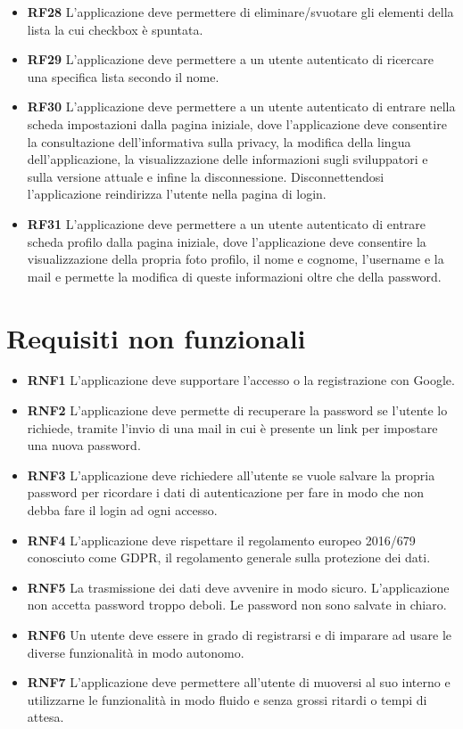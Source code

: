 \documentclass[a4paper,12pt]{article}
\begin{document}
\begin{itemize}
\item \textbf {\hypertarget{RF28}{RF28}} L'applicazione deve permettere di eliminare/svuotare gli elementi della lista la cui checkbox è spuntata.
\item \textbf {\hypertarget{RF29}{RF29}} L'applicazione deve permettere a un utente autenticato di ricercare una specifica lista secondo il nome.
\item \textbf {\hypertarget{RF30}{RF30}}  L'applicazione deve permettere a un utente autenticato di entrare nella scheda impostazioni dalla pagina iniziale, dove l'applicazione deve consentire la consultazione dell'informativa sulla privacy, la modifica della lingua dell'applicazione, la visualizzazione delle informazioni sugli sviluppatori e sulla versione attuale e infine la disconnessione. Disconnettendosi l'applicazione reindirizza l'utente nella pagina di login.
\item \textbf {\hypertarget{RF31}{RF31}}  L'applicazione deve permettere a un utente autenticato di entrare scheda profilo dalla pagina iniziale, dove l'applicazione deve consentire la visualizzazione della propria foto profilo, il nome e cognome, l'username e la mail e permette la modifica di queste informazioni oltre che della password.
\end{itemize}
\newpage
\section*{Requisiti non funzionali}
\begin{itemize} \setlength\itemsep{0.01em}

\item \textbf {\hypertarget{RNF1}{RNF1}}  L'applicazione deve supportare l'accesso o la registrazione con Google.
\item \textbf {\hypertarget{RNF2}{RNF2}}  L'applicazione deve permette di recuperare la password se l'utente lo richiede, tramite l'invio di una mail in cui è presente un link per impostare una nuova password.
\item \textbf {\hypertarget{RNF3}{RNF3}}  L'applicazione deve richiedere all'utente se vuole salvare la propria password per ricordare i dati di autenticazione per fare in modo che non debba fare il login ad ogni accesso.
\item \textbf {\hypertarget{RNF4}{RNF4}} L'applicazione deve rispettare il regolamento europeo 2016/679 conosciuto come GDPR, il regolamento generale sulla protezione dei dati.
\item \textbf {\hypertarget{RNF5}{RNF5}} 
La trasmissione dei dati deve avvenire in modo sicuro.
L'applicazione non accetta password troppo deboli.
Le password non sono salvate in chiaro.
\item \textbf {\hypertarget{RNF6}{RNF6}} Un utente deve essere in grado di registrarsi e di imparare ad usare le diverse funzionalità in modo autonomo.
\item \textbf {\hypertarget{RNF7}{RNF7}} L'applicazione deve permettere all'utente di muoversi al suo interno e utilizzarne le funzionalità in modo fluido e senza grossi ritardi o tempi di attesa.

\end{itemize}
\newpage
\end{document}
